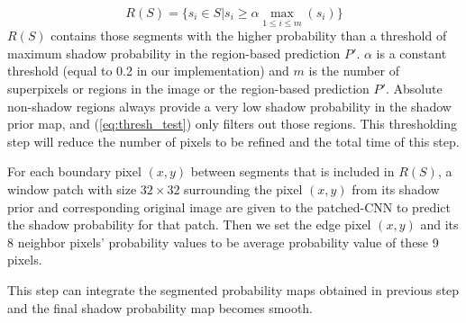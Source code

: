 \documentclass[letterpaper, 10 pt, conference]{ieeeconf}
\begin{document}
\begin{equation}
R(S) = \{s_i \in S| s_i \geq \alpha \max_{1 \leq i \leq m}(s_i) \}
\label{eq:thresh_test}
\end{equation}
$R(S)$ contains those segments with the higher probability than a threshold of maximum shadow probability in the region-based prediction $P'$. $\alpha$ is a constant threshold (equal to 0.2 in our implementation) and $m$ is the number of superpixels or regions in the image or the region-based prediction $P'$. Absolute non-shadow regions always provide a very low shadow probability in the shadow prior map, and (\ref{eq:thresh_test}) only filters out those regions. This thresholding step will reduce the number of pixels to be refined and the total time of this step.

For each boundary pixel $(x, y)$ between segments that is included in $R(S)$, a window patch with size $32 \times 32$ surrounding the pixel $(x, y)$ from its shadow prior and corresponding original image are given to the patched-CNN to predict the shadow probability for that patch. Then we set the edge pixel $(x, y)$ and its 8 neighbor pixels' probability values to be average probability value of these 9 pixels. 

This step can integrate the segmented probability maps obtained in previous step and the final shadow probability map becomes smooth.
\end{document}

